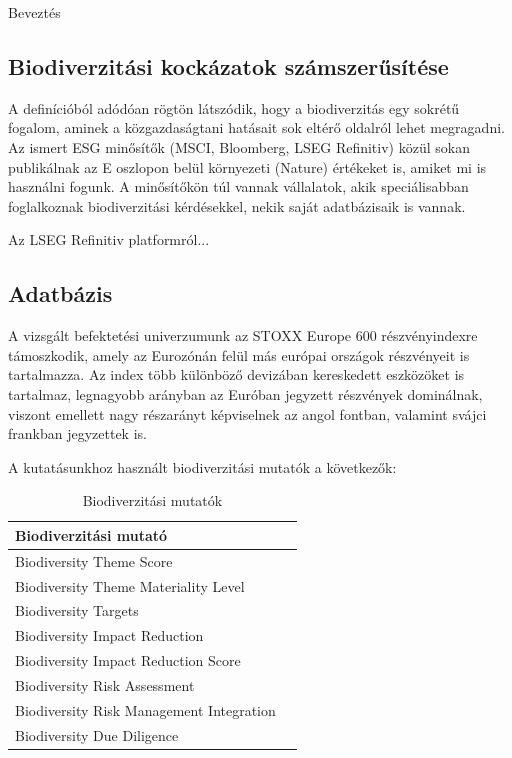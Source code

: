 Beveztés

\subsection{Biodiverzitási kockázatok számszerűsítése}

A definícióból adódóan rögtön látszódik, hogy a biodiverzitás egy sokrétű fogalom, aminek a közgazdaságtani hatásait sok eltérő oldalról lehet megragadni. Az ismert ESG minősítők (MSCI, Bloomberg, LSEG Refinitiv) közül sokan publikálnak az E oszlopon belül környezeti (Nature) értékeket is, amiket mi is használni fogunk. A minősítőkön túl vannak vállalatok, akik speciálisabban foglalkoznak biodiverzitási kérdésekkel, nekik saját adatbázisaik is vannak.

Az LSEG Refinitiv platformról...

\subsection{Adatbázis}

A vizsgált befektetési univerzumunk az STOXX Europe 600 részvényindexre támoszkodik, amely az Eurozónán felül más európai országok részvényeit is tartalmazza. Az index több különböző devizában kereskedett eszközöket is tartalmaz, legnagyobb arányban az Euróban jegyzett részvények dominálnak, viszont emellett nagy részarányt képviselnek az angol fontban, valamint svájci frankban jegyzettek is.

A kutatásunkhoz használt biodiverzitási mutatók a következők:

\begin{table}[h!]
\centering
    \begin{tabular}{lr}
        \hline
        \textbf{Biodiverzitási mutató} \\
        \hline
        Biodiversity Theme Score \\
        Biodiversity Theme Materiality Level \\
        Biodiversity Targets \\
        Biodiversity Impact Reduction \\
        Biodiversity Impact Reduction Score \\
        Biodiversity Risk Assessment \\
        Biodiversity Risk Management Integration \\
        Biodiversity Due Diligence \\
        \hline
    \end{tabular}
    \caption{Biodiverzitási mutatók}
\end{table}

